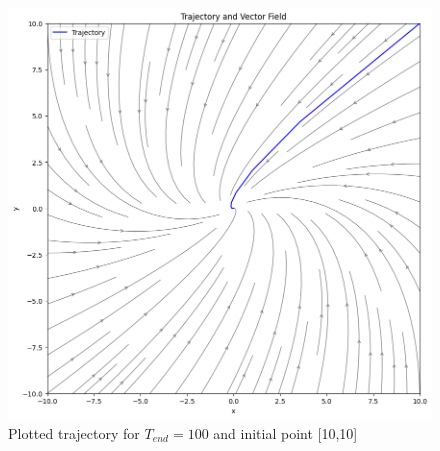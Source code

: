 \begin{itemize}
    \begin{figure}[H]
        \centering
        \includegraphics[width=0.6\linewidth]{images/Ex5task2_final.png}
        \caption{Plotted trajectory for $T_{end}=100$ and initial point [10,10]}
        \label{fig:task2final}
    \end{figure}
\end{itemize}